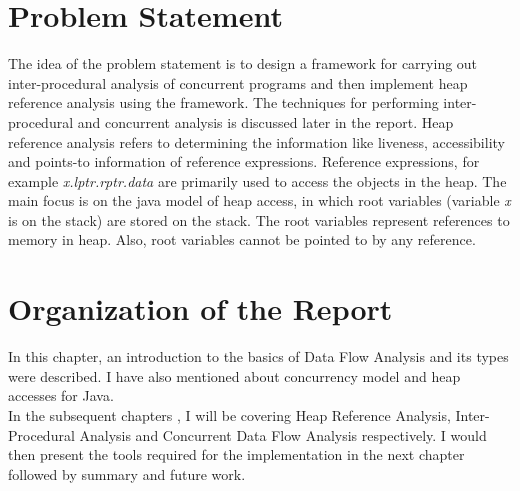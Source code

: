 \section{Problem Statement}  

The idea of the problem statement is to design a framework for carrying out inter-procedural analysis of concurrent programs and then implement heap reference analysis using the framework. The techniques for performing inter-procedural and concurrent analysis is discussed later in the report. Heap reference analysis refers to determining the information like liveness, accessibility and points-to information of reference expressions. Reference expressions, for example \emph{x.lptr.rptr.data} are primarily used to access the objects in the heap. The main focus is on the java model of heap access, in which root variables (variable \emph{x} is on the stack) are stored on the stack. The root variables represent references to memory in heap. Also, root variables cannot be pointed to by any reference.  
 
\section{Organization of the Report}

In this chapter, an introduction to the basics of Data Flow Analysis and its types were described. I have also mentioned about concurrency model and heap accesses for Java. \\

In the subsequent chapters , I will be covering Heap Reference Analysis, Inter-Procedural Analysis and Concurrent Data Flow Analysis respectively. I would then present the tools required for the implementation in the next chapter followed by summary and future work.    